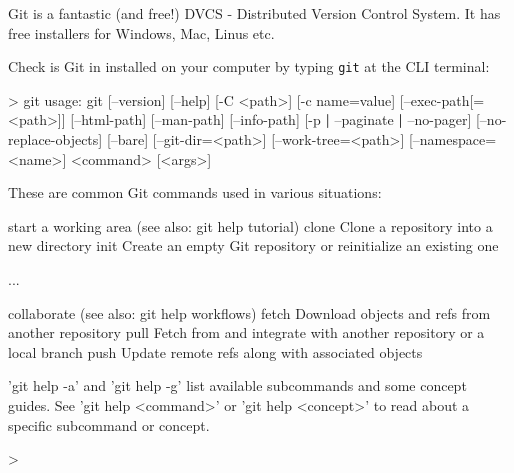 \documentclass[a4paperpaper,openright]{book}
\newenvironment{Shaded}{}{}
\newcommand{\BuiltInTok}[1]{#1}
\newcommand{\ExtensionTok}[1]{#1}
\newcommand{\FunctionTok}[1]{\textcolor[rgb]{0.02,0.16,0.49}{#1}}
\newcommand{\KeywordTok}[1]{\textcolor[rgb]{0.00,0.44,0.13}{\textbf{#1}}}
\newcommand{\NormalTok}[1]{#1}
\newcommand{\OperatorTok}[1]{\textcolor[rgb]{0.40,0.40,0.40}{#1}}
\newcommand{\StringTok}[1]{\textcolor[rgb]{0.25,0.44,0.63}{#1}}
\begin{document}
Git is a fantastic (and free!) DVCS - Distributed Version Control
System. It has free installers for Windows, Mac, Linus etc.

Check is Git in installed on your computer by typing \texttt{git} at the
CLI terminal:

\begin{Shaded}
\begin{Highlighting}[]
    \OperatorTok{>} \FunctionTok{git}
    \ExtensionTok{usage}\NormalTok{: git [--version] [--help] [-C }\OperatorTok{<}\NormalTok{path}\OperatorTok{>}\NormalTok{] [-c name=value]}
\NormalTok{               [}\ExtensionTok{--exec-path}\NormalTok{[=}\OperatorTok{<}\NormalTok{path}\OperatorTok{>}\NormalTok{]] [--html-path] [--man-path] [--info-path]}
\NormalTok{               [}\ExtensionTok{-p} \KeywordTok{|} \ExtensionTok{--paginate} \KeywordTok{|} \ExtensionTok{--no-pager}\NormalTok{] [--no-replace-objects] [--bare]}
\NormalTok{               [}\ExtensionTok{--git-dir}\NormalTok{=}\OperatorTok{<}\NormalTok{path}\OperatorTok{>}\NormalTok{] [--work-tree=}\OperatorTok{<}\NormalTok{path}\OperatorTok{>}\NormalTok{] [--namespace=}\OperatorTok{<}\NormalTok{name}\OperatorTok{>}\NormalTok{]}
               \OperatorTok{<}\BuiltInTok{command}\OperatorTok{>}\NormalTok{ [}\OperatorTok{<}\NormalTok{args}\OperatorTok{>}\NormalTok{]}

    \ExtensionTok{These}\NormalTok{ are common Git commands used in various situations:}

    \ExtensionTok{start}\NormalTok{ a working area (see also: git help tutorial)}
       \ExtensionTok{clone}\NormalTok{      Clone a repository into a new directory}
       \ExtensionTok{init}\NormalTok{       Create an empty Git repository or reinitialize an existing one}

    \ExtensionTok{...}

    \ExtensionTok{collaborate}\NormalTok{ (see also: git help workflows)}
       \ExtensionTok{fetch}\NormalTok{      Download objects and refs from another repository}
       \ExtensionTok{pull}\NormalTok{       Fetch from and integrate with another repository or a local branch}
       \ExtensionTok{push}\NormalTok{       Update remote refs along with associated objects}

    \StringTok{'git help -a'} \ExtensionTok{and} \StringTok{'git help -g'}\NormalTok{ list available subcommands and some}
    \ExtensionTok{concept}\NormalTok{ guides. See }\StringTok{'git help <command>'}\NormalTok{ or }\StringTok{'git help <concept>'}
    \ExtensionTok{to}\NormalTok{ read about a specific subcommand or concept.}

    \OperatorTok{>}
\end{Highlighting}
\end{Shaded}
\end{document}
